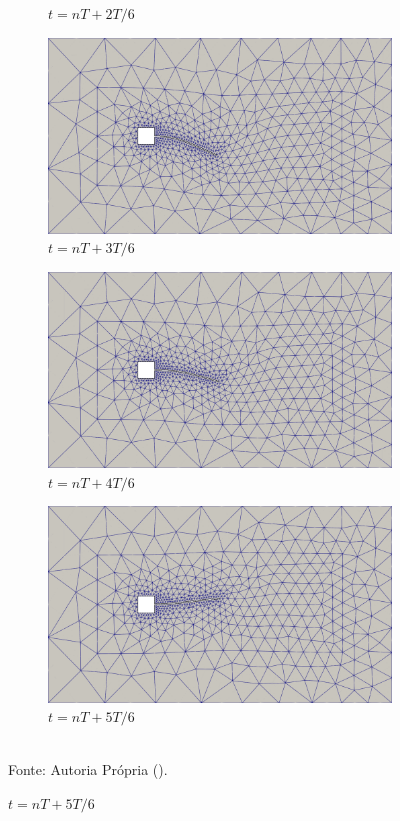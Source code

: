 \begin{figure}[h!]
\begin{subfigure}[b]{0.49\textwidth}
        \caption{$t=nT+2T/6$}
    \end{subfigure}
    \begin{subfigure}[b]{0.49\textwidth}
        \includegraphics[width=\linewidth]{Figuras/FSI-prism2/mT4.png}
        \caption{$t=nT+3T/6$}
    \end{subfigure}
    \begin{subfigure}[b]{0.49\textwidth}
        \includegraphics[width=\linewidth]{Figuras/FSI-prism2/mT5.png}
        \caption{$t=nT+4T/6$}
    \end{subfigure}
    \begin{subfigure}[b]{0.49\textwidth}
        \includegraphics[width=\linewidth]{Figuras/FSI-prism2/mT6.png}
        \caption{$t=nT+5T/6$}
    \end{subfigure}
    \\Fonte: Autoria Própria (\the\year).
    \label{fig:prismMesh2}
\end{figure}
\newpage

